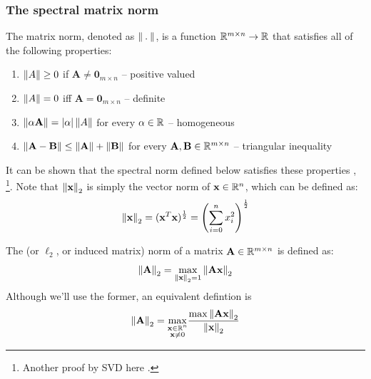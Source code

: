 \documentclass[a4paper]{article}
\begin{document}
\subsubsection{The spectral matrix norm}


\begin{definition}
The matrix norm, denoted as $\left\lVert\:.\:\right\rVert$, is a function $\mathbb{R}^{m \times n}\rightarrow \mathbb{R}$ that satisfies all of the following properties:
\begin{enumerate}
    \item $\left\lVert A\right\rVert \geq 0$ if $\textbf{A} \neq \textbf{0}_{m \times  n}$ -- positive valued
    \item $\left\lVert A\right\rVert = 0$ iff $\textbf{A}=\textbf{0}_{m\times n}$ -- definite
    \item $\left\lVert\alpha \textbf{A}\right\rVert = \left| \alpha \right|\left\lVert A\right\rVert$ for every $\alpha \in \mathbb{R}$ -- homogeneous
    \item $\left\lVert\textbf{A}-\textbf{B}\right\rVert \leq \left\lVert\textbf{A}\right\rVert + \left\lVert\textbf{B}\right\rVert$ for every $\textbf{A}, \textbf{B} \in \mathbb{R}^{m \times n}$ -- triangular inequality
\end{enumerate}
\end{definition}
It can be shown that the spectral norm defined below satisfies these properties \cite{lecnormsproof}, \cite{lecconrad} \footnote{Another proof by SVD here \cite{lecdalhe}.}. Note that $\left\lVert\textbf{x}\right\rVert_2$ is simply the vector norm of $\textbf{x}\in \mathbb{R}^n$, which can be defined as:
\begin{equation}
\left\lVert\textbf{x}\right\rVert_2 = (\textbf{x}^T\textbf{x})^{\frac{1}{2}} = \left(\sum\limits_{i=0}^{n}x_i^2\right)^{\frac{1}{2}}     
\end{equation}
\begin{definition}
The  (or $\ell_2$, or induced matrix) norm of a matrix $\textbf{A}\in \mathbb{R}^{m\times n}$ is defined as:
\begin{equation}
    \left\lVert\textbf{A}\right\rVert_2 = \underset{\left\lVert\textbf{x}\right\rVert_2=1}{\max}\left\lVert\textbf{Ax}\right\rVert_2 
\end{equation}
Although we'll use the former, an equivalent defintion is
\begin{equation}
    \left\lVert\textbf{A}\right\rVert_2 = \underset{\substack{\textbf{x}\in\mathbb{R}^n \\ \textbf{x} \neq 0}}
    {\max} 
    \frac{{\max}\left\lVert\textbf{Ax}\right\rVert_2}{\left\lVert\textbf{x}\right\rVert_2}
\end{equation}
\end{definition}
\end{document}
